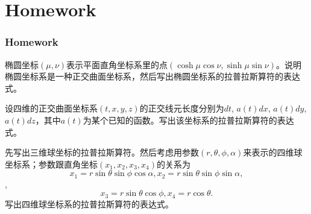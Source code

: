 \documentclass[CJK]{beamer}
\begin{document}
\section{Homework}

\begin{frame}
  \frametitle{Homework}
  
  \bitem
\item{椭圆坐标$(\mu,\nu)$表示平面直角坐标系里的点$(\cosh \mu \cos\nu, \sinh\mu\sin\nu)$。说明椭圆坐标系是一种正交曲面坐标系，然后写出椭圆坐标系的拉普拉斯算符的表达式。}
\item{设四维的正交曲面坐标系$(t,x,y,z)$的正交线元长度分别为$dt$, $a(t)dx$, $a(t)dy$, $a(t)dz$，其中$a(t)$为某个已知的函数。写出该坐标系的拉普拉斯算符的表达式。}
\item{先写出三维球坐标的拉普拉斯算符。然后考虑用参数$(r, \theta, \phi, \alpha)$来表示的四维球坐标系；参数跟直角坐标$(x_1, x_2, x_3,x_4)$的关系为 $$x_1 = r\sin\theta\sin\phi\cos\alpha, x_2=r\sin\theta\sin\phi\sin\alpha,$$,
  $$x_3=r\sin\theta\cos\phi, x_4 = r\cos\theta.$$  写出四维球坐标系的拉普拉斯算符的表达式。}
  \eitem

  
\end{frame}

\ech
\end{document}
